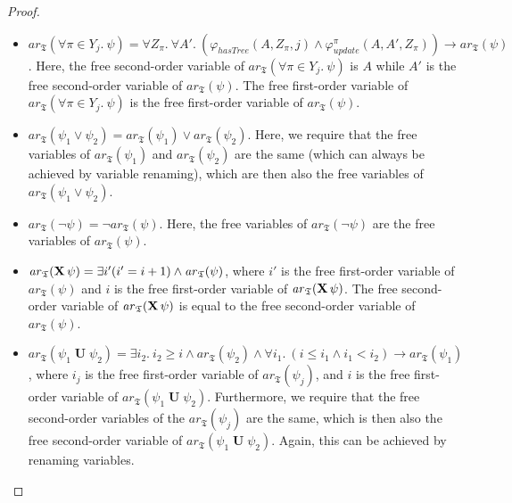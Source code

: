\documentclass[dvipsnames,10pt,a4paper]{amsart}
\theoremstyle{definition}
\theoremstyle{remark}
\renewcommand{\phi}{\varphi}
\DeclareMathOperator{\U}{\mathbf{U}}
\newcommand{\X}{\mathop{\mathbf{X}\vphantom{a}}\nolimits}
\newcommand{\tsys}{\mathfrak{T}}
\newcommand{\arithmetize}{{\mathit{ar}}}
\newcommand{\update}{\mathit{update}}
\newcommand{\hastree}{\mathit{hasTree}}
\begin{document}
\begin{proof}
\begin{itemize}
    Here, the free second-order variable of $\arithmetize_\tsys(\exists\pi\in Y_j.\ \psi)$ is $A$ while $A'$ is the free second-order variable of $\arithmetize_\tsys(\psi)$. The free first-order variable of $\arithmetize_\tsys(\exists\pi\in Y_j.\ \psi)$ is the free first-order variable of $\arithmetize_\tsys(\psi)$.


    \item $\arithmetize_\tsys(\forall\pi\in Y_j.\ \psi) = \forall Z_\pi.\ \forall A'.\ (\phi_\hastree(A,Z_\pi,j) \wedge \phi_\update^\pi(A,A',Z_\pi) )\rightarrow \arithmetize_\tsys(\psi)$.
    Here, the free second-order variable of $\arithmetize_\tsys(\forall\pi\in Y_j.\ \psi)$ is $A$ while $A'$ is the free second-order variable of $\arithmetize_\tsys(\psi)$. The free first-order variable of $\arithmetize_\tsys(\forall\pi\in Y_j.\ \psi)$ is the free first-order variable of $\arithmetize_\tsys(\psi)$.

    
    \item $\arithmetize_\tsys(\psi_1 \vee \psi_2) = \arithmetize_\tsys(\psi_1) \vee \arithmetize_\tsys(\psi_2)$. Here, we require that the free variables of $\arithmetize_\tsys(\psi_1)$ and $\arithmetize_\tsys(\psi_2)$ are the same (which can always be achieved by variable renaming), which are then also the free variables of $\arithmetize_\tsys(\psi_1 \vee \psi_2)$. 
    
    \item $\arithmetize_\tsys(\neg\psi) = \neg\arithmetize_\tsys(\psi)$. Here, the free variables of $\arithmetize_\tsys(\neg\psi) $ are the free variables of $ \arithmetize_\tsys(\psi)$.
    
     \item $\arithmetize_\tsys(\X\psi) =  \exists i' (i' = i+1) \wedge \arithmetize_\tsys(\psi)$, where $i'$ is the free first-order variable of $\arithmetize_\tsys(\psi)$ and $i$ is the free first-order variable of $\arithmetize_\tsys(\X\psi)$.
     The free second-order variable of $\arithmetize_\tsys(\X\psi)$ is equal to the free second-order variable of $\arithmetize_\tsys(\psi)$.
    
    \item $\arithmetize_\tsys(\psi_1\U\psi_2) =  \exists i_2.\ i_2 \ge i \wedge \arithmetize_\tsys(\psi_2) \wedge \forall i_1.\ (i \le i_1 \wedge i_1 < i_2) \rightarrow \arithmetize_\tsys(\psi_1)$, where $i_j$ is the free first-order variable of $\arithmetize_\tsys(\psi_j)$, %
    and $i$ is the free first-order variable of $\arithmetize_\tsys(\psi_1\U\psi_2)$.
    Furthermore, we require that the free second-order variables of the $\arithmetize_\tsys(\psi_j)$ are the same, which is then also the free second-order variable of $\arithmetize_\tsys(\psi_1\U\psi_2)$. Again, this can be achieved by renaming variables.


\end{itemize}
\end{proof}
\end{document}
